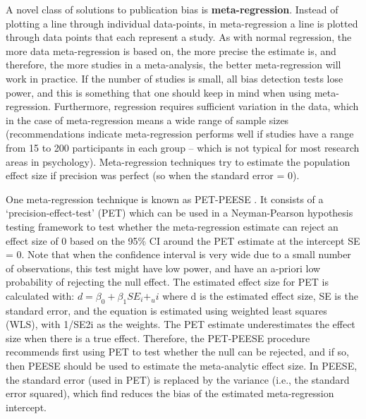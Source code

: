\documentclass[
  oneside]{book}
\begin{document}
A novel class of solutions to publication bias is \textbf{meta-regression}. Instead of plotting a line through individual data-points, in meta-regression a line is plotted through data points that each represent a study. As with normal regression, the more data meta-regression is based on, the more precise the estimate is, and therefore, the more studies in a meta-analysis, the better meta-regression will work in practice. If the number of studies is small, all bias detection tests lose power, and this is something that one should keep in mind when using meta-regression. Furthermore, regression requires sufficient variation in the data, which in the case of meta-regression means a wide range of sample sizes (recommendations indicate meta-regression performs well if studies have a range from 15 to 200 participants in each group -- which is not typical for most research areas in psychology). Meta-regression techniques try to estimate the population effect size if precision was perfect (so when the standard error = 0).

One meta-regression technique is known as PET-PEESE \citep{stanley_meta-regression_2014, stanley_finding_2017}. It consists of a `precision-effect-test' (PET) which can be used in a Neyman-Pearson hypothesis testing framework to test whether the meta-regression estimate can reject an effect size of 0 based on the 95\% CI around the PET estimate at the intercept SE = 0. Note that when the confidence interval is very wide due to a small number of observations, this test might have low power, and have an a-priori low probability of rejecting the null effect. The estimated effect size for PET is calculated with: \(d = β_0 + β_1SE_i + _ui\) where d is the estimated effect size, SE is the standard error, and the equation is estimated using weighted least squares (WLS), with 1/SE2i as the weights. The PET estimate underestimates the effect size when there is a true effect. Therefore, the PET-PEESE procedure recommends first using PET to test whether the null can be rejected, and if so, then PEESE should be used to estimate the meta-analytic effect size. In PEESE, the standard error (used in PET) is replaced by the variance (i.e., the standard error squared), which \citet{stanley_meta-regression_2014} find reduces the bias of the estimated meta-regression intercept.
\end{document}
